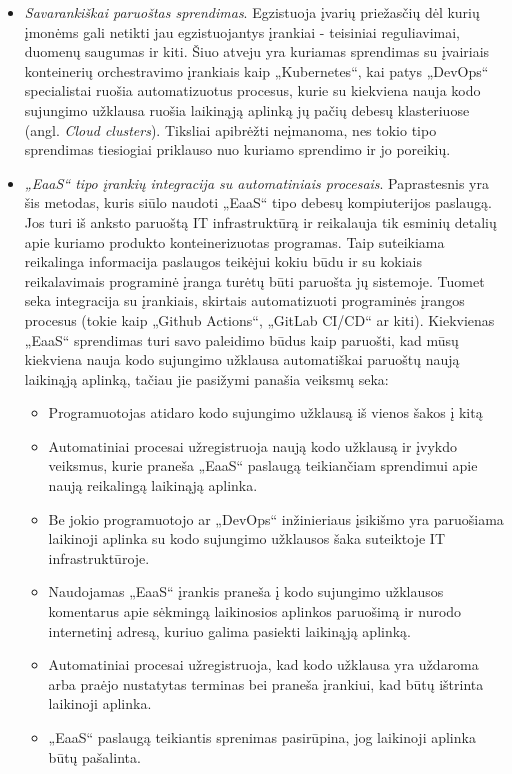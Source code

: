 \documentclass{VUMIFPSkursinis}
\begin{document}
\begin{itemize}
  \item \textit{Savarankiškai paruoštas sprendimas}. Egzistuoja įvarių priežasčių dėl kurių įmonėms gali netikti jau egzistuojantys įrankiai - teisiniai reguliavimai, duomenų saugumas ir kiti. Šiuo atveju yra kuriamas sprendimas su įvairiais konteinerių orchestravimo įrankiais kaip „Kubernetes“, kai patys „DevOps“ specialistai ruošia automatizuotus procesus, kurie su kiekviena nauja kodo sujungimo užklausa ruošia laikinąją aplinką jų pačių debesų klasteriuose (angl. \textit{Cloud clusters}). Tiksliai apibrėžti neįmanoma, nes tokio tipo sprendimas tiesiogiai priklauso nuo kuriamo sprendimo ir jo poreikių.

  \item \textit{„EaaS“ tipo įrankių integracija su automatiniais procesais}. Paprastesnis yra šis metodas, kuris siūlo naudoti „EaaS“ tipo debesų kompiuterijos paslaugą. Jos turi iš anksto paruoštą IT infrastruktūrą ir reikalauja tik esminių detalių apie kuriamo produkto konteinerizuotas programas. Taip suteikiama reikalinga informacija paslaugos teikėjui kokiu būdu ir su kokiais reikalavimais programinė įranga turėtų būti paruošta jų sistemoje. Tuomet seka integracija su įrankiais, skirtais automatizuoti programinės įrangos procesus (tokie kaip „Github Actions“, „GitLab CI/CD“ ar kiti). Kiekvienas „EaaS“ sprendimas turi savo paleidimo būdus kaip paruošti, kad mūsų kiekviena nauja kodo sujungimo užklausa automatiškai paruoštų naują laikinąją aplinką, tačiau jie pasižymi panašia veiksmų seka:

    \begin{itemize}
      \item Programuotojas atidaro kodo sujungimo užklausą iš vienos šakos į kitą
      \item Automatiniai procesai užregistruoja naują kodo užklausą ir įvykdo veiksmus, kurie praneša „EaaS“ paslaugą teikiančiam sprendimui apie naują reikalingą laikinąją aplinka.
      \item Be jokio programuotojo ar „DevOps“ inžinieriaus įsikišmo yra paruošiama laikinoji aplinka su kodo sujungimo užklausos šaka suteiktoje IT infrastruktūroje.
      \item Naudojamas „EaaS“ įrankis praneša į kodo sujungimo užklausos komentarus apie sėkmingą laikinosios aplinkos paruošimą ir nurodo internetinį adresą, kuriuo galima pasiekti laikinąją aplinką.
      \item Automatiniai procesai užregistruoja, kad kodo užklausa yra uždaroma arba praėjo nustatytas terminas bei praneša įrankiui, kad būtų ištrinta laikinoji aplinka.
      \item „EaaS“ paslaugą teikiantis sprenimas pasirūpina, jog laikinoji aplinka būtų pašalinta.
    \end{itemize}

\end{itemize}
\end{document}
